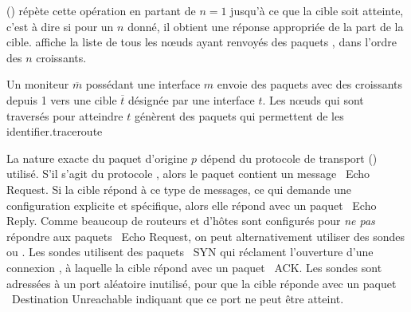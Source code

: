 \traceroute () répète cette opération en partant
de $n = 1$ jusqu'à ce que la cible soit atteinte, c'est à dire si pour
un $n$ donné, il obtient une réponse appropriée de la part de la cible.
\traceroute affiche la liste de tous les n\oe{}uds ayant renvoyés des paquets
\icmptimeout, dans l'ordre des \ttl $n$ croissants.

 {Un moniteur ${\overline
m}$ possédant une interface $m$ envoie des paquets \ip avec des \ttl croissants
depuis 1 vers une cible ${\overline t}$ désignée par une interface $t$. Les
n\oe{}uds qui sont traversés pour atteindre $t$ génèrent des paquets \icmptimeout
qui permettent de les identifier.}{traceroute}

La nature exacte du paquet d'origine $p$ dépend du protocole de transport
(\LLLL) utilisé. S'il s'agit du protocole \icmp, alors le paquet contient un
message \icmp~{\sc Echo Request}. Si la cible répond à ce type de messages, ce
qui demande une configuration explicite et spécifique, alors elle répond avec un
paquet \icmp~{\sc Echo Reply}. Comme beaucoup de routeurs et d'hôtes sont
configurés pour {\em ne pas} répondre aux paquets \icmp~{\sc Echo Request}, on
peut alternativement utiliser des sondes \tcp ou \udp. Les sondes \tcp utilisent
des paquets \tcp~{\sc SYN} qui réclament l'ouverture d'une connexion \tcp, à
laquelle la cible répond avec un paquet \tcp~{\sc ACK}. Les sondes \udp sont
adressées à un port aléatoire \apriori inutilisé, pour que la cible réponde avec
un paquet \icmp~{\sc Destination Unreachable} indiquant que ce port ne peut être
atteint.


